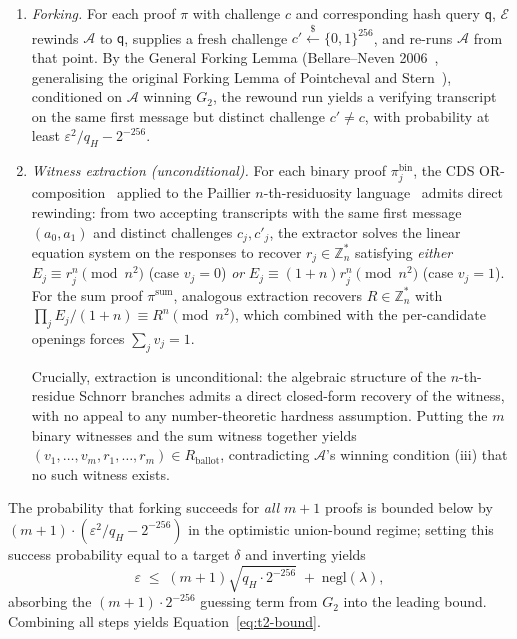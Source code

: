 \begin{enumerate}
    \item \emph{Forking.} For each proof $\pi$ with challenge $c$ and corresponding hash query $\mathsf{q}$, $\mathcal{E}$ rewinds $\mathcal{A}$ to $\mathsf{q}$, supplies a fresh challenge $c' \stackrel{\$}{\leftarrow} \{0,1\}^{256}$, and re-runs $\mathcal{A}$ from that point. By the General Forking Lemma (Bellare--Neven 2006~\cite{bellare2006forking}, generalising the original Forking Lemma of Pointcheval and Stern~\cite{pointcheval2000security}), conditioned on $\mathcal{A}$ winning $G_2$, the rewound run yields a verifying transcript on the same first message but distinct challenge $c' \neq c$, with probability at least $\varepsilon^2 / q_H - 2^{-256}$.

    \item \emph{Witness extraction (unconditional).} For each binary proof $\pi^{\text{bin}}_j$, the CDS OR-composition~\cite{cramer1994or} applied to the Paillier $n$-th-residuosity language~\cite{damgard_jurik2001} admits direct rewinding: from two accepting transcripts with the same first message $(a_0, a_1)$ and distinct challenges $c_j, c'_j$, the extractor solves the linear equation system on the responses to recover $r_j \in \mathbb{Z}_n^*$ satisfying \emph{either} $E_j \equiv r_j^{n} \pmod{n^2}$ (case $v_j = 0$) \emph{or} $E_j \equiv (1+n) r_j^{n} \pmod{n^2}$ (case $v_j = 1$). For the sum proof $\pi^{\text{sum}}$, analogous extraction recovers $R \in \mathbb{Z}_n^*$ with $\prod_j E_j / (1+n) \equiv R^{n} \pmod{n^2}$, which combined with the per-candidate openings forces $\sum_j v_j = 1$.

    Crucially, extraction is unconditional: the algebraic structure of the $n$-th-residue Schnorr branches admits a direct closed-form recovery of the witness, with no appeal to any number-theoretic hardness assumption. Putting the $m$ binary witnesses and the sum witness together yields $(v_1, \ldots, v_m, r_1, \ldots, r_m) \in R_{\text{ballot}}$, contradicting $\mathcal{A}$'s winning condition (iii) that no such witness exists.
\end{enumerate}

The probability that forking succeeds for \emph{all} $m+1$ proofs is bounded below by $(m+1) \cdot (\varepsilon^2 / q_H - 2^{-256})$ in the optimistic union-bound regime; setting this success probability equal to a target $\delta$ and inverting yields
\begin{equation*}
    \varepsilon \;\leq\; (m+1) \sqrt{q_H \cdot 2^{-256}} \;+\; \mathrm{negl}(\lambda),
\end{equation*}
absorbing the $(m+1) \cdot 2^{-256}$ guessing term from $G_2$ into the leading bound. Combining all steps yields Equation~\eqref{eq:t2-bound}.

